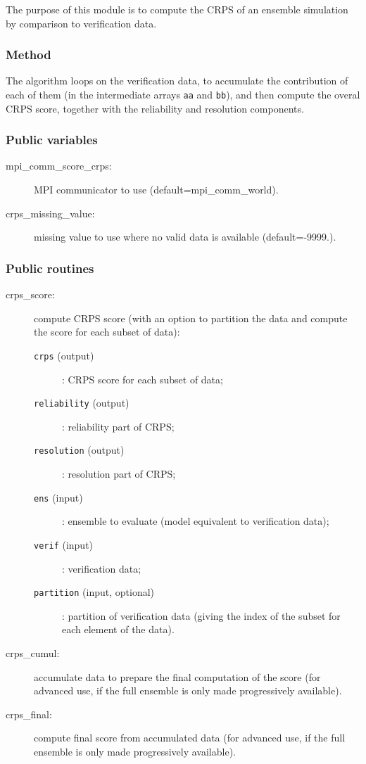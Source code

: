 \documentclass[11pt]{article}
\begin{document}
The purpose of this module is to compute the CRPS
of an ensemble simulation by comparison to verification data.

\subsubsection*{Method}

The algorithm loops on the verification data,
to accumulate the contribution of each of them
(in the intermediate arrays {\tt aa} and {\tt bb}),
and then compute the overal CRPS score,
together with the reliability and resolution components.

\subsubsection*{Public variables}

\begin{description}
\item[mpi\_comm\_score\_crps:] MPI communicator to use (default=mpi\_comm\_world).
\item[crps\_missing\_value:] missing value to use where no valid data is available (default=-9999.).
\end{description}

\subsubsection*{Public routines}

\begin{description}
\item[crps\_score:] compute CRPS score (with an option to partition the data
                    and compute the score for each subset of data):
  \begin{description}
  \item[{\tt crps} (output)]: CRPS score for each subset of data;
  \item[{\tt reliability} (output)]: reliability part of CRPS;
  \item[{\tt resolution} (output)]: resolution part of CRPS;
  \item[{\tt ens} (input)]: ensemble to evaluate (model equivalent to verification data);
  \item[{\tt verif} (input)]: verification data;
  \item[{\tt partition} (input, optional)]: partition of verification data
                                  (giving the index of the subset for each element of the data).
  \end{description}
\item[crps\_cumul:] accumulate data to prepare the final computation of the score
                    (for advanced use, if the full ensemble is only made progressively available).
\item[crps\_final:] compute final score from accumulated data
                    (for advanced use, if the full ensemble is only made progressively available).
\end{description}
\end{document}
